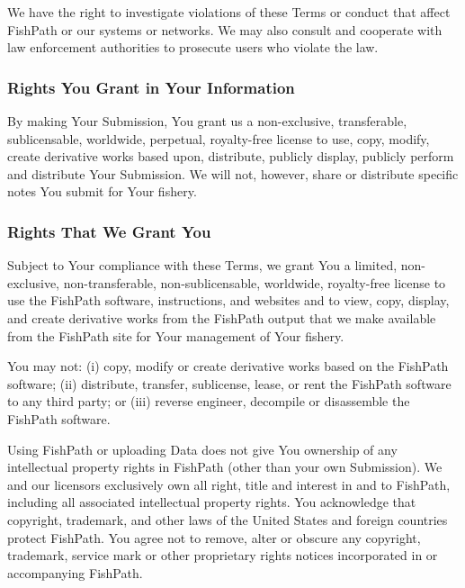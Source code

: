 \documentclass[11pt,]{book}
\begin{document}
We have the right to investigate violations of these Terms or conduct that affect FishPath or our systems or networks. We may also consult and cooperate with law enforcement authorities to prosecute users who violate the law.

\hypertarget{rights-you-grant-in-your-information}{%
\subsubsection*{Rights You Grant in Your Information}\label{rights-you-grant-in-your-information}}

By making Your Submission, You grant us a non-exclusive, transferable, sublicensable, worldwide, perpetual, royalty-free license to use, copy, modify, create derivative works based upon, distribute, publicly display, publicly perform and distribute Your Submission. We will not, however, share or distribute specific notes You submit for Your fishery.

\hypertarget{rights-that-we-grant-you}{%
\subsubsection*{Rights That We Grant You}\label{rights-that-we-grant-you}}

Subject to Your compliance with these Terms, we grant You a limited, non-exclusive, non-transferable, non-sublicensable, worldwide, royalty-free license to use the FishPath software, instructions, and websites and to view, copy, display, and create derivative works from the FishPath output that we make available from the FishPath site for Your management of Your fishery.

You may not: (i) copy, modify or create derivative works based on the FishPath software; (ii) distribute, transfer, sublicense, lease, or rent the FishPath software to any third party; or (iii) reverse engineer, decompile or disassemble the FishPath software.

Using FishPath or uploading Data does not give You ownership of any intellectual property rights in FishPath (other than your own Submission). We and our licensors exclusively own all right, title and interest in and to FishPath, including all associated intellectual property rights. You acknowledge that copyright, trademark, and other laws of the United States and foreign countries protect FishPath. You agree not to remove, alter or obscure any copyright, trademark, service mark or other proprietary rights notices incorporated in or accompanying FishPath.
\end{document}

